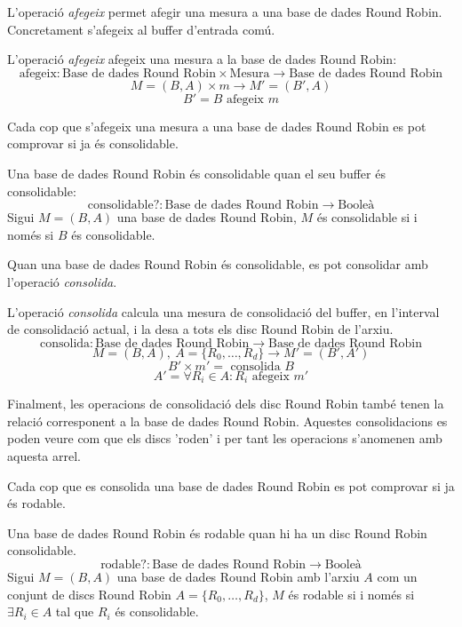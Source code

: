 {L'operació \emph{afegeix} permet afegir una mesura a una base de dades
Round Robin. Concretament s'afegeix al buffer d'entrada comú.
\begin{definition}
  L'operació \emph{afegeix} afegeix una mesura a la base de dades Round Robin:
  \[
  \text{afegeix}: \text{Base de dades Round Robin} \times \text{Mesura} \longrightarrow \text{Base de dades Round Robin}
  \]
  \[
  M=(B,A) \times m \longrightarrow M'= (B',A)
  \]
  \[
  B'= B \text{ afegeix } m
  \]
\end{definition}

Cada cop que s'afegeix una mesura a una base de dades Round Robin es pot comprovar si ja és consolidable. 

\begin{definition}
  Una base de dades Round Robin és consolidable quan el seu buffer és
  consolidable:
  \[
  \text{consolidable?}: \text{Base de dades Round Robin} \longrightarrow \text{Booleà}
  \]
  Sigui $M=(B,A)$ una base de dades Round Robin, $M$ és consolidable si i només
  si $B$ és consolidable.
\end{definition}

Quan una base de dades Round Robin és consolidable, es pot consolidar amb l'operació \emph{consolida}. 
 
\begin{definition}
  L'operació \emph{consolida} calcula una mesura de consolidació del
  buffer, en l'interval de consolidació actual, i la desa a tots els
  disc Round Robin de l'arxiu.
  \[
  \text{consolida}: \text{Base de dades Round Robin} \longrightarrow
  \text{Base de dades Round Robin}
  \]
  \[
  M=(B,A),\ A = \{R_0,\ldots,R_d\} \longrightarrow M'= (B',A')
  \]
  \[
  B' \times m'= \text{ consolida } B 
  \]
  \[
  A'= \forall R_i\in A: R_i \text{ afegeix } m'
  \]
\end{definition}

Finalment, les operacions de consolidació dels disc Round Robin també tenen la relació corresponent a la base de dades Round Robin. Aquestes consolidacions es poden veure com que els discs 'roden' i per tant les operacions s'anomenen amb aquesta arrel.

Cada cop que es consolida una base de dades Round Robin es pot comprovar si ja és rodable. 

\begin{definition}
  Una base de dades Round Robin és rodable quan hi ha un disc Round
  Robin consolidable.
  \[
  \text{rodable?}: \text{Base de dades Round Robin} \longrightarrow \text{Booleà}
  \]
  Sigui $M=(B,A)$ una base de dades Round Robin amb l'arxiu $A$ com un conjunt de discs Round Robin $A = \{R_0,\ldots,R_d\}$, $M$ és rodable si i només
  si  $\exists R_i\in A$ tal que $R_i$ és consolidable.
\end{definition}

}
